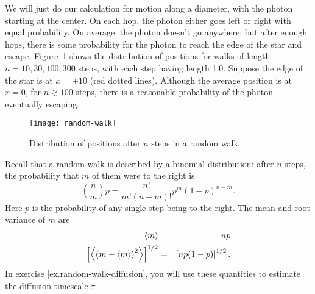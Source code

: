 We will just do our calculation for motion along a diameter, with the photon starting at the center. On each hop, the photon either goes left or right with equal probability. On average, the photon doesn't go anywhere; but after enough hops, there is some probability for the photon to reach the edge of the star and escape. Figure~\ref{f.random-walk} shows the distribution of positions for walks of length $n = 10, 30, 100, 300$ steps, with each step having length 1.0. Suppose the edge of the star is at $x=\pm 10$ (red dotted lines).  Although the average position is at $x=0$, for $n \gtrsim 100$ steps, there is a reasonable probability of the photon eventually escaping.
\begin{figure}[htbp]
\texttt{[image: random-walk]}
\caption[Distribution of positions in a random walk]{\label{f.random-walk} Distribution of positions after $n$ steps in a random walk.}
\end{figure}

Recall that a random walk is described by a binomial distribution: after $n$ steps, the probability that $m$ of them were to the right is
\begin{equation}\label{e.binomial}
    \binom{n}{m}{p} = \frac{n!}{m!(n-m)!} p^{m}(1-p)^{n-m}.
\end{equation}
Here $p$ is the probability of any single step being to the right.
The mean and root variance of $m$ are
\begin{eqnarray}
	\left\langle m\right\rangle &=& np \label{e.mean-binomial} \\
	\left[\left\langle\left(m-\left\langle m\right\rangle\right)^{2}\right\rangle\right]^{1/2} &=& \left[np(1-p)\right]^{1/2}. \label{e.var-binomial}
\end{eqnarray}
In exercise \ref{ex.random-walk-diffusion}, you will use these quantities to estimate the diffusion timescale $\tau$.


